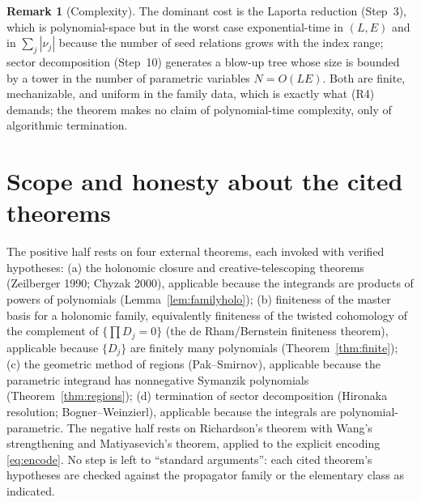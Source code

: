 \documentclass{amsart}
\theoremstyle{definition}
\newtheorem{remark}{Remark}
\begin{document}
\begin{remark}[Complexity]
The dominant cost is the Laporta reduction (Step~3), which is polynomial-space
but in the worst case exponential-time in $(L,E)$ and in
$\sum_j|\nu_j|$ because the number of seed relations grows with the index
range; sector decomposition (Step~10) generates a blow-up tree whose size is
bounded by a tower in the number of parametric variables $N=O(LE)$. Both are
finite, mechanizable, and uniform in the family data, which is exactly what
(R4) demands; the theorem makes no claim of polynomial-time complexity, only of
algorithmic termination.
\end{remark}

\section{Scope and honesty about the cited theorems}

The positive half rests on four external theorems, each invoked with verified
hypotheses: (a) the holonomic closure and creative-telescoping theorems
(Zeilberger 1990; Chyzak 2000), applicable because the integrands are products
of powers of polynomials (Lemma~\ref{lem:familyholo}); (b) finiteness of the
master basis for a holonomic family, equivalently finiteness of the twisted
cohomology of the complement of $\{\prod D_j=0\}$ (the de Rham/Bernstein
finiteness theorem), applicable because $\{D_j\}$ are finitely many polynomials
(Theorem~\ref{thm:finite}); (c) the geometric method of regions
(Pak--Smirnov), applicable because the parametric integrand has nonnegative
Symanzik polynomials (Theorem~\ref{thm:regions}); (d) termination of sector
decomposition (Hironaka resolution; Bogner--Weinzierl), applicable because the
integrals are polynomial-parametric. The negative half rests on Richardson's
theorem with Wang's strengthening and Matiyasevich's theorem, applied to the
explicit encoding \eqref{eq:encode}. No step is left to ``standard arguments'':
each cited theorem's hypotheses are checked against the propagator family or
the elementary class as indicated.
\end{document}
